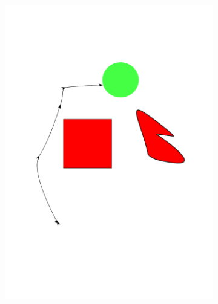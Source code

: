 \documentclass[../thesis.tex]{subfiles}
\begin{document}
\begin{figure}
\begin{subfigure}[b]{0.24\linewidth}
    \includegraphics[width=\linewidth]{./Planning/trajectory_3.pdf}
  \end{subfigure}
  \hfill
  \begin{subfigure}[b]{0.24\linewidth}

\end{subfigure}
\end{figure}
\end{document}

